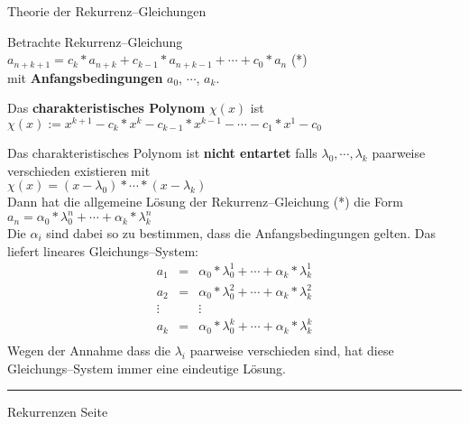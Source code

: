 
\begin{slide}{}
\normalsize

\begin{center}
Theorie der Rekurrenz--Gleichungen
\end{center}
\vspace*{0.5cm}

\footnotesize
Betrachte Rekurrenz--Gleichung \\[0.3cm]
\hspace*{0.3cm} $a_{n+k+1} = c_k * a_{n+k} + c_{k-1} * a_{n+k-1} + \cdots + c_0 * a_{n}$ \hspace*{\fill} (*)\\[0.3cm]
mit \textbf{Anfangsbedingungen} $a_0$, $\cdots$, $a_k$.

Das \textbf{charakteristisches Polynom} $\chi(x)$ ist \\[0.3cm]
\hspace*{1.3cm}  $\chi(x) := x^{k+1} - c_k * x^{k} - c_{k-1} * x^{k-1} - \cdots - c_1 * x^{1} - c_0$ 

Das charakteristisches Polynom ist \textbf{nicht entartet} falls $\lambda_0, \cdots, \lambda_k$ paarweise verschieden existieren mit\\[0.3cm]
\hspace*{1.3cm} $\chi(x) = (x - \lambda_0) * \cdots * (x - \lambda_k)$ \\[0.3cm]
Dann hat die allgemeine L\"osung der Rekurrenz--Gleichung (*) die Form \\[0.3cm]
\hspace*{1.3cm} $a_n = \alpha_0 * \lambda_0^n + \cdots + \alpha_k * \lambda_k^n$ \\[0.3cm]
Die $\alpha_i$ sind dabei so zu bestimmen, dass die Anfangsbedingungen gelten.  Das liefert lineares Gleichungs--System:
$$
\begin{array}{lcl}
  a_1 & = & \alpha_0 * \lambda_0^1 + \cdots + \alpha_k * \lambda_k^1 \\[0.3cm]
  a_2 & = & \alpha_0 * \lambda_0^2 + \cdots + \alpha_k * \lambda_k^2 \\[0.3cm]
   \vdots & & \vdots                                                 \\[0.3cm]
  a_k & = & \alpha_0 * \lambda_0^k + \cdots + \alpha_k * \lambda_k^k \\[0.3cm]
\end{array}
$$
Wegen der Annahme dass die $\lambda_i$ paarweise verschieden sind, hat diese Gleichungs--System immer eine
eindeutige L\"osung.


\vspace*{\fill}
\tiny \addtocounter{mypage}{1}
\rule{17cm}{1mm}
Rekurrenzen  \hspace*{\fill} Seite 
\end{slide}

